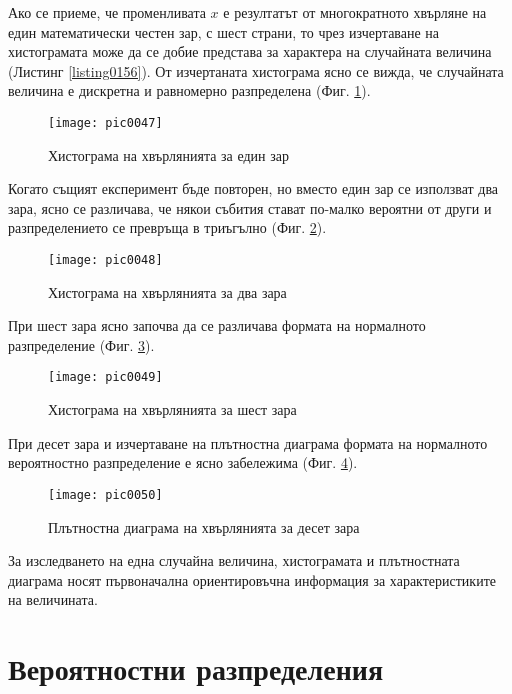 Ако се приеме, че променливата $x$ е резултатът от многократното хвърляне на един математически честен зар, с шест страни, то чрез изчертаване на хистограмата може да се добие представа за характера на случайната величина (Листинг \ref{listing0156}). От изчертаната хистограма ясно се вижда, че случайната величина е дискретна и равномерно разпределена (Фиг. \ref{figure0047}).

\begin{figure}[h!]
  \centering
  \texttt{[image: pic0047]}
  \caption{Хистограма на хвърлянията за един зар}
\label{figure0047}
\end{figure}
\FloatBarrier

Когато същият експеримент бъде повторен, но вместо един зар се използват два зара, ясно се различава, че някои събития стават по-малко вероятни от други и разпределението се превръща в триъгълно (Фиг. \ref{figure0048}).

\begin{figure}[h!]
  \centering
  \texttt{[image: pic0048]}
  \caption{Хистограма на хвърлянията за два зара}
\label{figure0048}
\end{figure}
\FloatBarrier

При шест зара ясно започва да се различава формата на нормалното разпределение (Фиг. \ref{figure0049}).

\begin{figure}[h!]
  \centering
  \texttt{[image: pic0049]}
  \caption{Хистограма на хвърлянията за шест зара}
\label{figure0049}
\end{figure}
\FloatBarrier

При десет зара и изчертаване на плътностна диаграма формата на нормалното вероятностно разпределение е ясно забележима (Фиг. \ref{figure0050}).

\begin{figure}[h!]
  \centering
  \texttt{[image: pic0050]}
  \caption{Плътностна диаграма на хвърлянията за десет зара}
\label{figure0050}
\end{figure}
\FloatBarrier

За изследването на една случайна величина, хистограмата и плътностната диаграма носят първоначална ориентировъчна информация за характеристиките на величината.

\section{Вероятностни разпределения}

